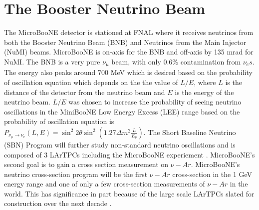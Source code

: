 \chapter{The Booster Neutrino Beam}
The MicroBooNE detector is stationed at FNAL where it receives neutrinos from both the Booster Neutrino Beam (BNB) and Neutrinos from the Main Injector (NuMI) beams. MicroBooNE is on-axis for the BNB and off-axis by 135 mrad for NuMI. The BNB is a very pure $\nu_{\mu}$ beam, with only 0.6\% contamination from $\nu_{e}s$. The energy also peaks around 700 MeV which is desired based on the probability of oscillation equation which depends on the the value of $L/E$, where $L$ is the distance of the detector from the neutrino beam and $E$ is the energy of the neutrino beam. $L/E$ was chosen to increase the probability of seeing neutrino oscillations in the MiniBooNE Low Energy Excess (LEE) range based on the probability of oscillation equation is $ P_{\nu_{\mu}\rightarrow \nu_{e}}\left(L,E\right) = \sin^2 2\theta \sin^2 \left(1.27\Delta m^2 \frac{L}{E_{\nu}}\right)$. The Short Baseline Neutrino (SBN) Program will further study non-standard neutrino oscillations and is composed of 3 LArTPCs including the MicroBooNE experiement \cite{SBN}. MicroBooNE's second goal is to gain a cross section measurement on $\nu-Ar$. MicroBooNE's neutrino cross-section program will be the first $\nu-Ar$ cross-section in the 1 GeV energy range and one of only a few cross-section measurements of $\nu-Ar$ in the world. This has significance in part because of the large scale LArTPCs slated for construction over the next decade \cite{dune} \cite{SBN}. 


